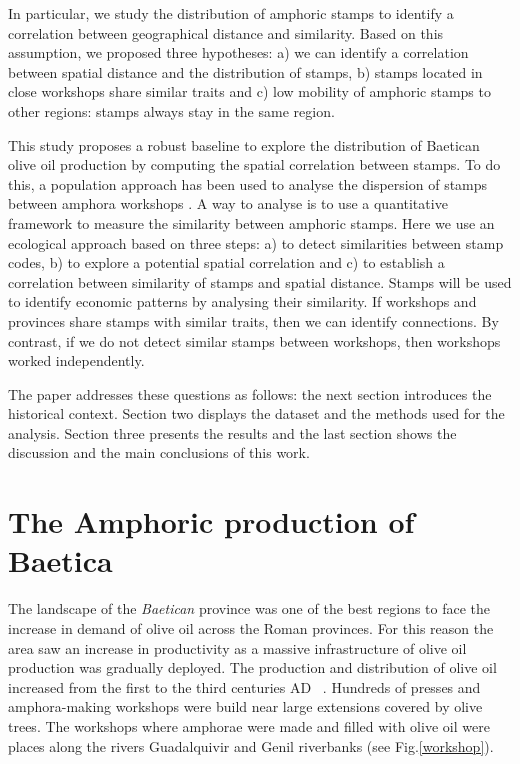 \documentclass[review]{elsarticle}
\begin{document}
In particular, we study the distribution of amphoric stamps to identify a correlation between geographical distance and similarity. Based on this assumption, we proposed three hypotheses: a) we can identify a correlation between spatial distance and the distribution of stamps, b) stamps located in close workshops share similar traits and c) low mobility of amphoric stamps to other regions: stamps always stay in the same region. 


This study proposes a robust baseline to explore the distribution of Baetican olive oil production by computing the spatial correlation between stamps. To do this, a population approach has been used to analyse the dispersion of stamps between amphora workshops \citep{rubio-campillo_ecology_2018}.  A way to analyse is to use a quantitative framework to measure the similarity between amphoric stamps. Here we use an ecological approach based on three steps: a) to detect similarities between stamp codes, b) to explore a potential spatial correlation and c) to establish a correlation between similarity of stamps and spatial distance. Stamps will be used to identify economic patterns by analysing their similarity. If workshops and provinces share stamps with similar traits, then we can identify connections. By contrast, if we do not detect similar stamps between workshops, then workshops worked independently. 

The paper addresses these questions as follows: the next section introduces the historical context. Section two displays the dataset and the methods used for the analysis. Section three presents the results and the last section shows the discussion and the main conclusions of this work. 


\section{The Amphoric production of Baetica}

The landscape of the \textit{Baetican} province was one of the best regions to face the increase in demand of olive oil across the Roman provinces. For this reason the area saw an increase in productivity as a massive infrastructure of olive oil production was gradually deployed. The production and distribution of olive oil increased from the first to the third centuries AD ~\citep{remesal_concierto}. Hundreds of presses and amphora-making workshops were build near large extensions covered by olive trees. The workshops where amphorae were made and filled with olive oil were places along the rivers Guadalquivir and Genil riverbanks (see Fig.\ref{workshop}).
\end{document}
